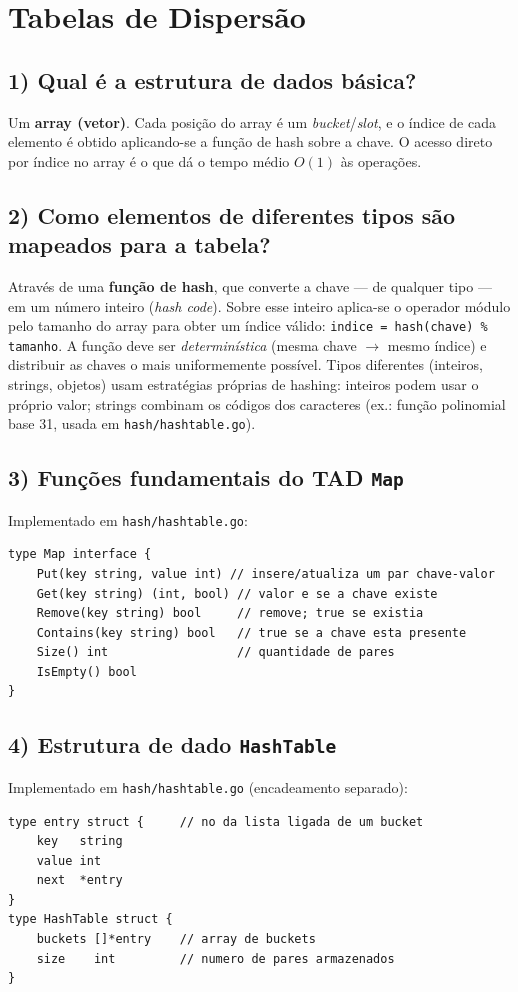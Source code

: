 \documentclass[11pt,a4paper]{article}
\begin{document}
\newpage
\section*{Tabelas de Dispersão}

\subsection*{1) Qual é a estrutura de dados básica?}
Um \textbf{array (vetor)}. Cada posição do array é um \emph{bucket}/\emph{slot}, e o índice de
cada elemento é obtido aplicando-se a função de hash sobre a chave. O acesso direto por índice
no array é o que dá o tempo médio $O(1)$ às operações.

\subsection*{2) Como elementos de diferentes tipos são mapeados para a tabela?}
Através de uma \textbf{função de hash}, que converte a chave --- de qualquer tipo --- em um
número inteiro (\emph{hash code}). Sobre esse inteiro aplica-se o operador módulo pelo tamanho
do array para obter um índice válido: \texttt{indice = hash(chave) \% tamanho}. A função deve
ser \emph{determinística} (mesma chave $\rightarrow$ mesmo índice) e distribuir as chaves o mais
uniformemente possível. Tipos diferentes (inteiros, strings, objetos) usam estratégias próprias
de hashing: inteiros podem usar o próprio valor; strings combinam os códigos dos caracteres
(ex.: função polinomial base 31, usada em \texttt{hash/hashtable.go}).

\subsection*{3) Funções fundamentais do TAD \texttt{Map}}
Implementado em \texttt{hash/hashtable.go}:
\begin{lstlisting}
type Map interface {
    Put(key string, value int) // insere/atualiza um par chave-valor
    Get(key string) (int, bool) // valor e se a chave existe
    Remove(key string) bool     // remove; true se existia
    Contains(key string) bool   // true se a chave esta presente
    Size() int                  // quantidade de pares
    IsEmpty() bool
}
\end{lstlisting}

\subsection*{4) Estrutura de dado \texttt{HashTable}}
Implementado em \texttt{hash/hashtable.go} (encadeamento separado):
\begin{lstlisting}
type entry struct {     // no da lista ligada de um bucket
    key   string
    value int
    next  *entry
}
type HashTable struct {
    buckets []*entry    // array de buckets
    size    int         // numero de pares armazenados
}
\end{lstlisting}
\end{document}
